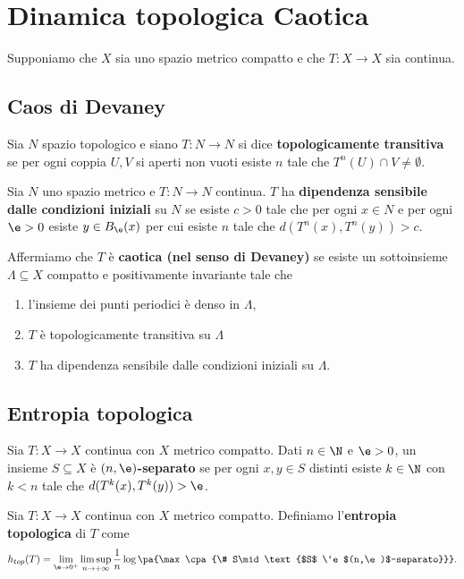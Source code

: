 \chapter{Dinamica topologica Caotica}
Supponiamo che $X$ sia uno spazio metrico compatto e che $T:X\to X$ sia continua.
\section{Caos di Devaney}
\begin{definition}
Sia $N$ spazio topologico e siano  $T:N\to N$ si dice \textbf{topologicamente transitiva} se per ogni coppia $U,V$ si aperti non vuoti esiste $n$ tale che $T^n(U)\cap V\neq \emptyset$.
\end{definition}
\begin{definition}
Sia $N$ uno spazio metrico e $T:N\to N$ continua. $T$ ha \textbf{dipendenza sensibile dalle condizioni iniziali} su $N$ se esiste $c>0$ tale che per ogni $x\in N$ e per ogni $\e>0$ esiste $y\in B_\e(x)$ per cui esiste $n$ tale che $d(T^n(x),T^n(y))>c$.
\end{definition}
\begin{definition}
Affermiamo che $T$ \`e \textbf{caotica (nel senso di Devaney)} se esiste un sottoinsieme $\Lambda\subseteq X$ compatto e positivamente invariante tale che
\begin{enumerate}
\item l'insieme dei punti periodici \`e denso in $\Lambda$,
\item $T$ \`e topologicamente transitiva su $\Lambda$
\item $T$ ha dipendenza sensibile dalle condizioni iniziali su $\Lambda$.
\end{enumerate}
\end{definition}

\section{Entropia topologica}
\begin{definition}
Sia $T:X\to X$ continua con $X$ metrico compatto. Dati $n\in\N$ e $\e>0$, un insieme $S\subseteq X$ \`e \textbf{$(n,\e)$-separato} se per ogni $x,y\in S$ distinti esiste $k\in\N$ con $k<n$ tale che $d(T^k(x),T^k(y))>\e$.
\end{definition}

\begin{definition}
Sia $T:X\to X$ continua con $X$ metrico compatto. Definiamo l'\textbf{entropia topologica} di $T$ come
\[h_{top}(T)=\lim_{\e\to0^+}\limsup_{n\to+\infty}\frac1n\log\pa{\max\cpa{\# S\mid \text{$S$ \`e $(n,\e)$-separato}}}.\]
\end{definition}

